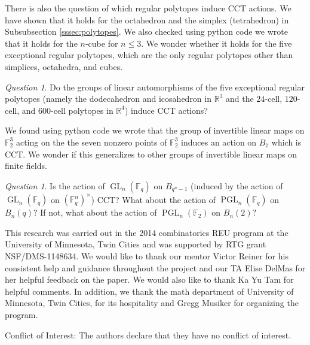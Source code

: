 \documentclass[smallextended, envcountsame, numbook]{svjour3}
\theoremstyle{plain}
\theoremstyle{definition}
\theoremstyle{remark}
\newtheorem{que}[thm]{Question}
\numberwithin{equation}{section}
\begin{document}
There is also the question of which regular polytopes induce CCT actions. We have shown that it holds for the octahedron and the simplex (tetrahedron) in Subsubsection \ref{sssec:polytopes}. We also checked using python code we wrote that it holds for the $n$-cube for $n \leq 3$. We wonder whether it holds for the five exceptional regular polytopes, which are the only regular polytopes other than simplices, octahedra, and cubes.

\begin{que}
\label{question:exceptional_polytopes_cct}
Do the groups of linear automorphisms of the five exceptional regular polytopes (namely the dodecahedron and icosahedron in $\mathbb R^3$ and the $24$-cell, $120$-cell, and $600$-cell polytopes in $\mathbb R^4$) induce CCT actions?
\end{que}

We found using python code we wrote that the group of invertible linear maps on $\mathbb F_2^3$ acting on the the seven nonzero points of $\mathbb F_2^3$ induces an action on $B_7$ which is CCT. We wonder if this generalizes to other groups of invertible linear maps on finite fields.

\begin{que}
Is the action of $\operatorname{GL}_n(\mathbb F_q)$ on $B_{q^n-1}$ (induced by the action of $\operatorname{GL}_n(\mathbb F_q)$ on $(\mathbb F_q^n)^\times$) CCT? What about the action of $\operatorname{PGL}_n(\mathbb F_q)$ on $B_n(q)?$ If not, what about the action of $\operatorname{PGL}_n(\mathbb F_2)$ on $B_n(2)?$ 
\end{que}

\begin{acknowledgements}
This research was carried out in the 2014 combinatorics REU program at the University of Minnesota, Twin Cities and was supported by RTG grant NSF/DMS-1148634.
We would like to thank our mentor Victor Reiner for his consistent help and guidance throughout the project and our TA Elise DelMas for her helpful feedback on the paper. We would also like to thank Ka Yu Tam for helpful comments.  In addition, we thank the math department of University of Minnesota, Twin Cities, for its hospitality and Gregg Musiker for organizing the program.
\end{acknowledgements}

Conflict of Interest: The authors declare that they have no conflict of interest.

\medskip 

\nocite{*}


\end{document}
